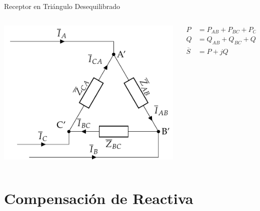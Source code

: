 \documentclass[aspectratio=169, usenames,svgnames,dvipsnames]{beamer}
\begin{document}
\begin{frame}[label={sec:orgbd680c1}]{Receptor en Triángulo Desequilibrado}
\begin{columns}
\begin{column}{0.6\columnwidth}
\begin{center}
\includegraphics[width=.9\linewidth]{../figs/TrianguloDesequilibrado_Receptor.pdf}
\end{center}
\end{column}

\begin{column}{0.4\columnwidth}
\begin{align*}
  P &= P_{AB} + P_{BC} + P_{CA}\\
  Q &= Q_{AB} + Q_{BC} + Q_{CA}\\
  \overline{S} &= P + jQ
\end{align*}
\end{column}
\end{columns}
\end{frame}

\section{Compensación de Reactiva}
\label{sec:orgee887b1}
\end{document}
